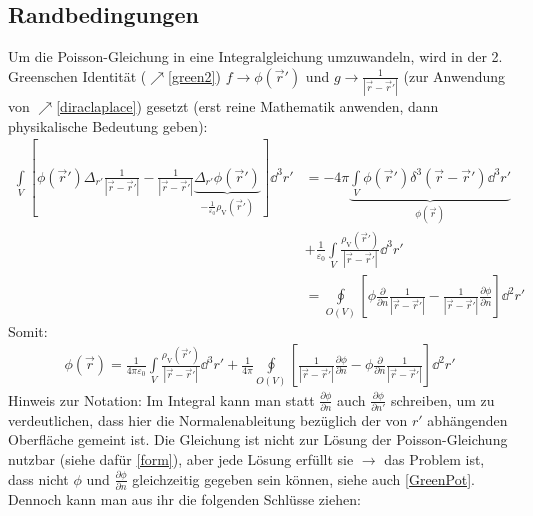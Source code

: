 \subsection{Randbedingungen}
		   Um die Poisson-Gleichung in eine Integralgleichung umzuwandeln, wird in der 2. Greenschen Identität ($\nearrow$\ref{green2}) $f\to\phi(\vec{r}' )$ und $g\to \frac{1}{|\vec{r}  - \vec{r}' |}$ (zur Anwendung von $\nearrow$\ref{diraclaplace}) gesetzt (erst reine Mathematik anwenden, dann physikalische Bedeutung geben):
		        \begin{align*}
			        \int\limits_V \left[  \phi(\vec{r}' ) \Delta _{ r'} \frac{1}{|\vec{r}  - \vec{r}' |}  - \frac{1}{|\vec{r}  - \vec{r}' |} \underbrace{\Delta _{ r'}  \phi(\vec{r}' )}_{-\frac{1}{\varepsilon_{0}}\rho_{\text{V}}(\vec{r}')} \right] \dd^3 r' & =  -4\pi \underbrace{\int\limits_V  \phi(\vec{r}' ) \delta^3 (\vec{r}  - \vec{r}' ) \dd^3r'  }_{\phi(\vec{r})}                \\
			                                                                                                                                                                                                                    & + \frac{1}{\varepsilon_0} \int\limits_V \frac{\rho_{\text{V}}(\vec{r}' )}{|\vec{r}  - \vec{r}' |} \dd^3r' \\
			                                                                                                                                                                                                                    & = \oint\limits_{O(V)} \left[\phi\frac{\partial}{\partial n}\frac{1}{|\vec{r}  - \vec{r}' |}
				        - \frac{1}{|\vec{r}  - \vec{r}' |}\frac{\partial\phi}{\partial n} \right] \dd^2r'
		        \end{align*}
		   Somit:
		        \begin{equation}\label{skalarpotGL}\begin{split}
				        \boxed{ \phi(\vec{r} ) = \frac{1}{4\pi\varepsilon_0} \int\limits_V
					        \frac{\rho_\text{V}(\vec{r}' )}{|\vec{r} -\vec{r}' |}
					        \dd^3 r' + \frac{1}{4\pi} \oint\limits_{O(V)} \left[\frac{1}{|\vec{r}  - \vec{r}' |}\frac{\partial\phi}{\partial n} - \phi\frac{\partial}{\partial n}\frac{1}{|\vec{r}  - \vec{r}' |} \right] \dd^2r'}
			        \end{split}\end{equation}
		   Hinweis zur Notation: Im Integral kann man statt $\frac{\partial\phi}{\partial n}$ auch $\frac{\partial\phi}{\partial n'}$ schreiben, um zu verdeutlichen, dass hier die Normalenableitung bezüglich der von $r'$ abhängenden Oberfläche gemeint ist. Die Gleichung ist nicht zur Lösung der Poisson-Gleichung nutzbar (siehe dafür \ref{form}), aber jede Lösung erfüllt sie $\to$ das Problem ist, dass nicht $\phi$ und $\frac{\partial\phi}{\partial n}$ gleichzeitig gegeben sein können, siehe auch \ref{GreenPot}. Dennoch kann man aus ihr die folgenden Schlüsse ziehen:\\
